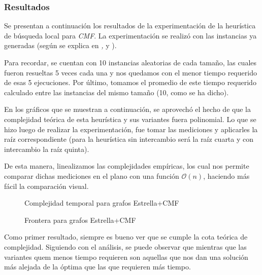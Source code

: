 \subsubsection{Resultados}
\par Se presentan a continuaci\'on los resultados de la experimentaci\'on
    de la heur\'istica de b\'usqueda local para \emph{CMF}. La experimentaci\'on se realiz\'o
    con las instancias ya generadas (seg\'un se explica en \emph{,
    } y \emph{}).

\par Para recordar, se cuentan con 10 instancias aleatorias de cada tama\~no,
    las cuales fueron resueltas 5 veces cada una y nos quedamos con el menor tiempo
    requerido de esas 5 ejecuciones. Por \'ultimo, tomamos el promedio de este tiempo
    requerido calculado entre las instancias del mismo tama\~no (10, como se ha
    dicho).

\par En los gr\'aficos que se muestran a continuaci\'on, se aprovech\'o el hecho
    de que la complejidad te\'orica de esta heur\'istica y sus variantes fuera
    polinomial. Lo que se hizo luego de realizar la experimentaci\'on, fue
    tomar las mediciones y aplicarles la ra\'iz correspondiente (para la heur\'istica
    sin intercambio ser\'a la ra\'iz cuarta y con intercambio la ra\'iz quinta).

\par De esta manera, linealizamos las complejidades emp\'iricas, los cual nos permite
    comparar dichas mediciones en el plano con una funci\'on $\mathcal O(n)$, haciendo
    m\'as f\'acil la comparaci\'on visual.

\bigskip

\begin{figure}[H]
    \centering
    \fontsize{7}{10}\selectfont
    \resizebox{0.8\textwidth}{!}{}
    \caption{Complejidad temporal para grafos Estrella+CMF}
\end{figure}

\begin{figure}[H]
    \centering
    \fontsize{7}{10}\selectfont
    \resizebox{0.87\textwidth}{!}{}
    \caption{Frontera para grafos Estrella+CMF}
\end{figure}

\bigskip

\par Como primer resultado, siempre es bueno ver que se cumple la cota te\'orica de complejidad.
    Siguiendo con el an\'alisis, se puede observar que mientras que las variantes quem
    menos tiempo requieren son aquellas que nos dan una soluci\'on m\'as alejada de la
    \'optima que las que requieren m\'as tiempo.

